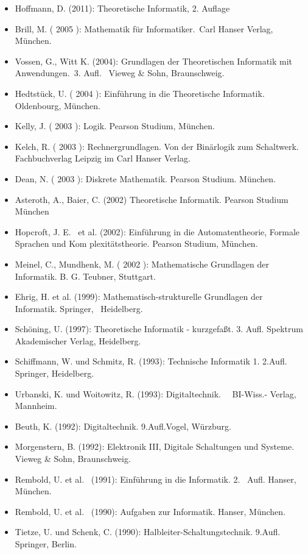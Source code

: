 \begin{itemize}
\item
  Hoffmann, D. (2011): Theoretische Informatik, 2. Auflage
\item
  Brill, M. ( 2005 ): Mathematik für Informatiker.~Carl Hanser Verlag,
  München.
\item
  Vossen, G., Witt K. (2004): Grundlagen der Theoretischen Informatik
  mit Anwendungen.~3. Aufl.~ Vieweg \& Sohn, Braunschweig.
\item
  Hedtstück, U. ( 2004 ): Einführung in die Theoretische Informatik.
  Oldenbourg, München.
\item
  Kelly, J. ( 2003 ): Logik. Pearson Studium, München.
\item
  Kelch, R. ( 2003 ): Rechnergrundlagen. Von der Binärlogik zum
  Schaltwerk. Fachbuchverlag Leipzig im Carl Hanser Verlag.
\item
  Dean, N. ( 2003 ): Diskrete Mathematik. Pearson Studium. München.
\item
  Asteroth, A., Baier, C. (2002) Theoretische Informatik. Pearson
  Studium München
\item
  Hopcroft, J. E.~ et al. (2002): Einführung in die Automatentheorie,
  Formale Sprachen und Kom plexitätstheorie. Pearson Studium, München.
\item
  Meinel, C., Mundhenk, M. ( 2002 ): Mathematische Grundlagen der
  Informatik. B. G. Teubner, Stuttgart.
\item
  Ehrig, H. et al. (1999): Mathematisch-strukturelle Grundlagen der
  Informatik. Springer,~ Heidelberg.
\item
  Schöning, U. (1997): Theoretische Informatik - kurzgefaßt. 3. Aufl.
  Spektrum Akademischer Verlag, Heidelberg.
\item
  Schiffmann, W. und Schmitz, R. (1993): Technische Informatik 1.
  2.Aufl. Springer, Heidelberg.
\item
  Urbanski, K. und Woitowitz, R. (1993): Digitaltechnik.~~ BI-Wiss.-
  Verlag, Mannheim.
\item
  Beuth, K. (1992): Digitaltechnik. 9.Aufl.Vogel, Würzburg.
\item
  Morgenstern, B. (1992): Elektronik III, Digitale Schaltungen und
  Systeme. Vieweg \& Sohn, Braunschweig.
\item
  Rembold, U. et al.~ (1991): Einführung in die Informatik. 2.~ Aufl.
  Hanser, München.~~~~~~~~~~~~~~~~~~~~~~~~~~~~~~~
\item
  Rembold, U. et al.~ (1990): Aufgaben zur Informatik. Hanser, München.
\item
  Tietze, U. und Schenk, C. (1990): Halbleiter-Schaltungstechnik.
  9.Aufl. Springer, Berlin.
\end{itemize}

